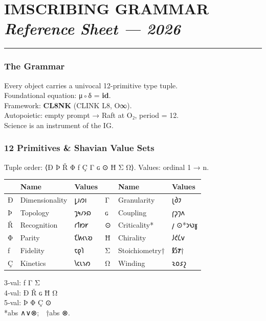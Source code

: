 \hypertarget{imscribing-grammar-reference-sheet-2026}{%
\section{\texorpdfstring{IMSCRIBING GRAMMAR \emph{Reference Sheet ---
2026}}{IMSCRIBING GRAMMAR Reference Sheet --- 2026}}\label{imscribing-grammar-reference-sheet-2026}}

\begin{center}\rule{0.5\linewidth}{0.5pt}\end{center}

\hypertarget{the-grammar}{%
\subsubsection{The Grammar}\label{the-grammar}}

Every object carries a univocal 12-primitive type tuple.\\
Foundational equation: μ◦δ = \textbf{id}.\\
Framework: \textbf{CL8NK} (CLINK L8, O∞).\\
Autopoietic: empty prompt → Raft at O₂, period = 12.\\
Science is an instrument of the IG.

\hypertarget{primitives-shavian-value-sets}{%
\subsubsection{12 Primitives \& Shavian Value
Sets}\label{primitives-shavian-value-sets}}

Tuple order: ⟨Ð Þ Ř Φ ƒ Ç Γ ɢ ⊙ Ħ Σ Ω⟩. Values: ordinal 1 → n.

\begin{longtable}[]{@{}llllll@{}}
\toprule
& Name & Values & & Name & Values\tabularnewline
\midrule
\endhead
Ð & Dimensionality & 𐑛𐑨𐑼𐑦 & Γ & Granularity & 𐑚𐑔𐑲\tabularnewline
Þ & Topology & 𐑡𐑰𐑥𐑶𐑸 & ɢ & Coupling & 𐑝𐑜𐑠𐑵\tabularnewline
Ř & Recognition & 𐑩𐑑𐑽𐑾 & ⊙ & Criticality* & 𐑢 ⊙*𐑮𐑻𐑣\tabularnewline
Φ & Parity & 𐑗𐑿𐑬𐑯𐑹 & Ħ & Chirality & 𐑓𐑒𐑖𐑫\tabularnewline
ƒ & Fidelity & 𐑱𐑞𐑐 & Σ & Stoichiometry† & 𐑙𐑕\textbf{𐑳}†\tabularnewline
Ç & Kinetics & 𐑘𐑤𐑧𐑪𐑺 & Ω & Winding & 𐑷𐑴𐑭𐑟\tabularnewline
\bottomrule
\end{longtable}

3‑val: ƒ Γ Σ\\
4‑val: Ð Ř ɢ Ħ Ω\\
5‑val: Þ Φ Ç ⊙\\
*abs ∧∨⊗; †abs ⊗.

